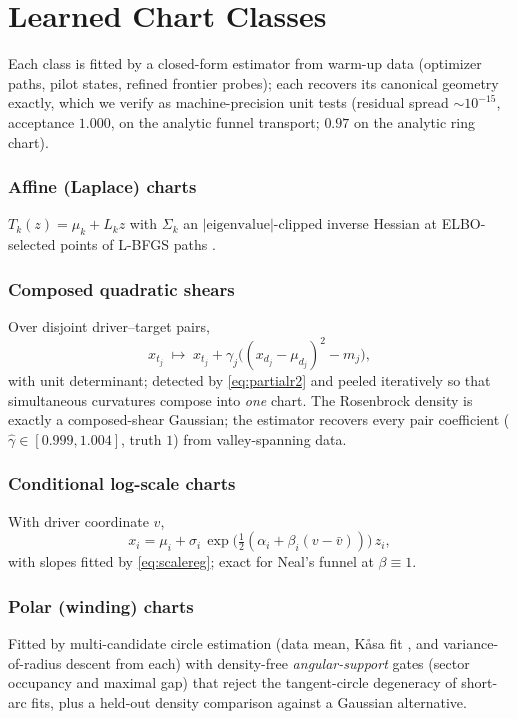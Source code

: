 \documentclass[10pt,journal,compsoc]{IEEEtran}
\begin{document}
\section{Learned Chart Classes}\label{sec:charts}
Each class is fitted by a closed-form estimator from warm-up data
(optimizer paths, pilot states, refined frontier probes); each recovers its
canonical geometry exactly, which we verify as machine-precision unit tests
(residual spread $\sim10^{-15}$, acceptance $1.000$, on the analytic funnel
transport; $0.97$ on the analytic ring chart).

\subsubsection{Affine (Laplace) charts}
$T_k(z)=\mu_k+L_kz$ with $\Sigma_k$ an
$|\text{eigenvalue}|$-clipped inverse Hessian at ELBO-selected points of
L-BFGS paths \cite{zhang2022,liu1989}.

\subsubsection{Composed quadratic shears}
Over disjoint driver--target pairs,
\begin{equation}
x_{t_j}\;\mapsto\;x_{t_j}+\gamma_j\bigl((x_{d_j}-\mu_{d_j})^2-m_j\bigr),
\label{eq:shear}
\end{equation}
with unit determinant; detected by \eqref{eq:partialr2} and peeled
iteratively so that simultaneous curvatures compose into \emph{one} chart.
The Rosenbrock density is exactly a composed-shear Gaussian; the estimator
recovers every pair coefficient ($\hat\gamma\in[0.999,1.004]$, truth $1$)
from valley-spanning data.

\subsubsection{Conditional log-scale charts}
With driver coordinate $v$,
\begin{equation}
x_i=\mu_i+\sigma_i\,
\exp\!\bigl(\tfrac12(\alpha_i+\beta_i(v-\bar v))\bigr)\,z_i,
\label{eq:scalechart}
\end{equation}
with slopes fitted by \eqref{eq:scalereg}; exact for Neal's funnel
\cite{neal2003} at $\beta\equiv1$.

\subsubsection{Polar (winding) charts}
Fitted by multi-candidate circle estimation (data mean, K\r{a}sa fit
\cite{kasa1976}, and variance-of-radius descent from each) with
density-free \emph{angular-support} gates (sector occupancy and maximal
gap) that reject the tangent-circle degeneracy of short-arc fits, plus a
held-out density comparison against a Gaussian alternative.
\end{document}
